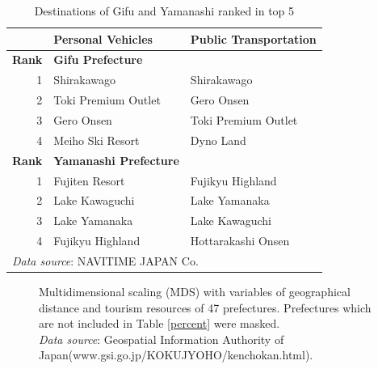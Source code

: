 \documentclass[10pt, conference, compsocconf]{IEEEtran}
\begin{document}
 \begin{table}[!h]\caption{Destinations of Gifu and Yamanashi ranked in top 5}
\label{dest}
\centering
\begin{tabular}{rll}
\hline
 & \bf Personal Vehicles& \bf Public Transportation \\ \hline
\bf Rank & \bf Gifu Prefecture \\\hline
1 & Shirakawago & Shirakawago \\
2 & Toki Premium Outlet & Gero Onsen \\
3 & Gero Onsen & Toki Premium Outlet \\
4 & Meiho Ski Resort & Dyno Land \\
\bf  Rank & \bf Yamanashi Prefecture \\\hline
1 & Fujiten Resort & Fujikyu Highland \\
2 & Lake Kawaguchi & Lake Yamanaka \\
3 & Lake Yamanaka & Lake Kawaguchi \\
4 & Fujikyu Highland & Hottarakashi Onsen\\
\hline
\multicolumn{3}{l}{{\it Data source}: NAVITIME JAPAN Co.}
\end{tabular}
\end{table}

\begin{figure}[!t]
\centering
{}
\qquad
{}
\caption{Multidimensional scaling (MDS) with variables of geographical distance and tourism resources of 47 prefectures. Prefectures which are not included in Table \ref{percent} were masked.
\\{\it Data source}: Geospatial Information Authority of Japan(www.gsi.go.jp/KOKUJYOHO/kenchokan.html).}\label{multi}
\end{figure}
\end{document}
